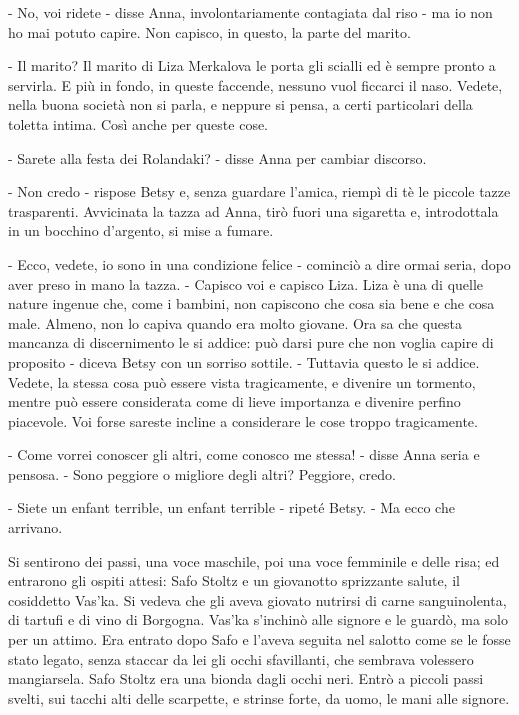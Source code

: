 - No, voi ridete - disse Anna, involontariamente contagiata dal riso - ma io non ho mai potuto capire. Non capisco, in questo, la parte del marito. 

- Il marito? Il marito di Liza Merkalova le porta gli scialli ed è sempre pronto a servirla. E più in fondo, in queste faccende, nessuno vuol ficcarci il naso. Vedete, nella buona società non si parla, e neppure si pensa, a certi particolari della toletta intima. Così anche per queste cose. 

- Sarete alla festa dei Rolandaki? - disse Anna per cambiar discorso. 

- Non credo - rispose Betsy e, senza guardare l'amica, riempì di tè le piccole tazze trasparenti. Avvicinata la tazza ad Anna, tirò fuori una sigaretta e, introdottala in un bocchino d'argento, si mise a fumare. 

- Ecco, vedete, io sono in una condizione felice - cominciò a dire ormai seria, dopo aver preso in mano la tazza. - Capisco voi e capisco Liza. Liza è una di quelle nature ingenue che, come i bambini, non capiscono che cosa sia bene e che cosa male. Almeno, non lo capiva quando era molto giovane. Ora sa che questa mancanza di discernimento le si addice: può darsi pure che non voglia capire di proposito - diceva Betsy con un sorriso sottile. - Tuttavia questo le si addice. Vedete, la stessa cosa può essere vista tragicamente, e divenire un tormento, mentre può essere considerata come di lieve importanza e divenire perfino piacevole. Voi forse sareste incline a considerare le cose troppo tragicamente. 

- Come vorrei conoscer gli altri, come conosco me stessa! - disse Anna seria e pensosa. - Sono peggiore o migliore degli altri? Peggiore, credo. 

- Siete un enfant terrible, un enfant terrible - ripeté Betsy. - Ma ecco che arrivano. 

\label{xviii-2} 

Si sentirono dei passi, una voce maschile, poi una voce femminile e delle risa; ed entrarono gli ospiti attesi: Safo Stoltz e un giovanotto sprizzante salute, il cosiddetto Vas'ka. Si vedeva che gli aveva giovato nutrirsi di carne sanguinolenta, di tartufi e di vino di Borgogna. Vas'ka s'inchinò alle signore e le guardò, ma solo per un attimo. Era entrato dopo Safo e l'aveva seguita nel salotto come se le fosse stato legato, senza staccar da lei gli occhi sfavillanti, che sembrava volessero mangiarsela. Safo Stoltz era una bionda dagli occhi neri. Entrò a piccoli passi svelti, sui tacchi alti delle scarpette, e strinse forte, da uomo, le mani alle signore. 

